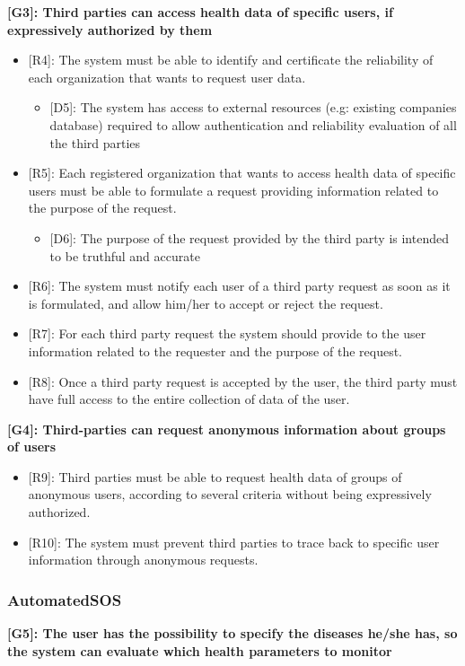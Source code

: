 \textbf{[G3]: Third parties can access health data of specific users, if expressively authorized by them}

\begin{itemize}
	\item {[R4]: The system must be able to identify and certificate the reliability of each organization that wants to request user data.}
	\begin{itemize}
		\item {[D5]: The system has access to external resources (e.g: existing companies database) required to allow authentication and reliability evaluation of all the third parties}
	\end{itemize}
	\item {[R5]: Each registered organization that wants to access health data of specific users must be able to formulate a request providing information related to the purpose of the request.}
	\begin{itemize}
		\item {[D6]: The purpose of the request provided by the third party is intended to be truthful and accurate}
	\end{itemize} 
	\item {[R6]: The system must notify each user of a third party request as soon as it is formulated, and allow him/her to accept or reject the request.}
	\item {[R7]: For each third party request the system should provide to the user information related to the requester and the purpose of the request.}
	\item {[R8]: Once a third party request is accepted by the user, the third party must have full access to the entire collection of data of the user.}
\end{itemize}

\textbf{[G4]: Third-parties can request anonymous information about groups of users}

\begin{itemize}
	\item {[R9]: Third parties must be able to request health data of groups of anonymous users, according to several criteria without being expressively authorized.}
	\item {[R10]: The system must prevent third parties to trace back to specific user information through anonymous requests.}
\end{itemize}

{\color{Blue}\subsubsection{AutomatedSOS}}
\raggedright
\textbf{[G5]: The user has the possibility to specify the diseases he/she has, so the system can evaluate which health parameters to monitor}

